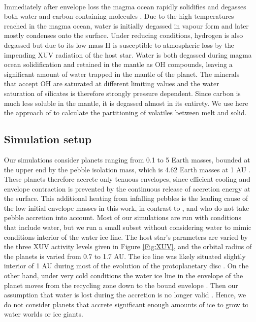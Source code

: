 \documentclass[bibyear,tradiabstract]{aa}
\begin{document}
\\
{Immediately after envelope loss the magma ocean rapidly solidifies and} degasses both water and carbon-containing molecules \citep{Lichtenberg+2021}. Due to the high temperatures reached in the magma ocean, water is initially degassed in vapour form and later mostly condenses onto the surface. Under reducing conditions, hydrogen is also degassed \citep{Ortenzi+2020} but due to its low mass H is susceptible to atmospheric loss by the impending XUV radiation of the host star. Water is both degassed during magma ocean solidification and retained in the mantle as OH compounds, leaving a significant amount of water trapped in the mantle of the planet. The minerals that accept OH are saturated at different limiting values and the water saturation of silicates is therefore strongly pressure dependent. Since carbon is much less soluble in the mantle, it is degassed almost in its entirety. We use here the approach of \cite{Elkins-Tanton2008} to calculate the partitioning of volatiles between melt and solid.
\subsection{Simulation setup}
Our simulations consider planets ranging from 0.1 to 5 Earth masses, bounded at the upper end by the pebble isolation mass, which is 4.62 Earth masses at 1 AU \citep{Bitsch+2018}. These planets therefore accrete only tenuous envelopes, since efficient cooling and envelope contraction is prevented by the continuous release of accretion energy at the surface. {This additional heating from infalling pebbles is the leading cause of the low initial envelope masses in this work, in contrast to \cite{Lambrechts+2019}, \cite{Mordasini+2020} and \cite{Ormel+2021} who do not take pebble accretion into account.} Most of our simulations are run with conditions that include water, but we run a small subset without considering water to mimic conditions interior of the water ice line. The host star's parameters are varied by the three XUV activity levels given in Figure \ref{Fig:XUV}, and the orbital radius of the planets is varied from 0.7 to 1.7 AU. The ice line was likely situated slightly interior of 1 AU during most of the evolution of the protoplanetary disc \citep{Mori+2021}. On the other hand, under very cold conditions the water ice line in the envelope of the planet moves from the recycling zone down to the bound envelope \citep{Wang+2023}. Then our assumption that water is lost during the accretion is no longer valid \citep{Johansen+2021}. Hence, we do not consider planets that accrete significant enough amounts of ice to grow to water worlds or ice giants.
\end{document}
